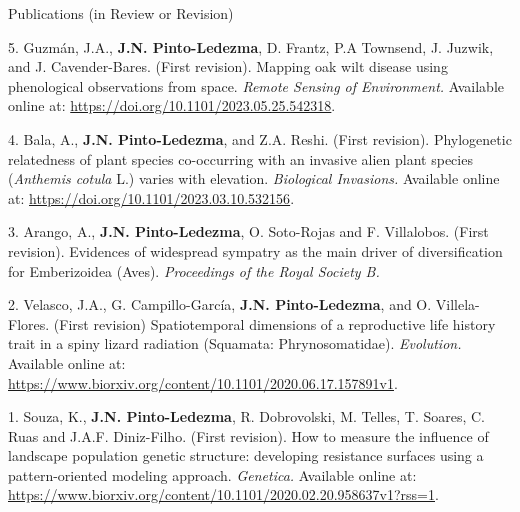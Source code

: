 \documentclass{resume} %
\begin{document}

\begin{rSection}{Publications (in Review or Revision)} 

\normalfont 

{5.} {Guzmán, J.A.,} {\bf{J.N. Pinto-Ledezma}}, {D. Frantz, P.A Townsend, J. Juzwik, and J. Cavender-Bares. (First revision). Mapping oak wilt disease using phenological observations from space.} {\em Remote Sensing of Environment.} {Available online at:} \url {https://doi.org/10.1101/2023.05.25.542318}.

{4.} {Bala, A.,} {\bf{J.N. Pinto-Ledezma\dag}}, and {Z.A. Reshi\dag. (First revision). Phylogenetic relatedness of plant species co-occurring with an invasive alien plant species ({\em Anthemis cotula} L.) varies with elevation.} {\em Biological Invasions.} {Available online at:} \url {https://doi.org/10.1101/2023.03.10.532156}.

{3.} {Arango, A.,} {\bf{J.N. Pinto-Ledezma}}, { O. Soto-Rojas and F. Villalobos. (First revision). Evidences of widespread sympatry as the main driver of diversification for Emberizoidea (Aves).} {\em Proceedings of the Royal Society B.}

{2.} {Velasco, J.A., G. Campillo-García,} {\bf{J.N. Pinto-Ledezma}}, {and O. Villela-Flores. (First revision) Spatiotemporal dimensions of a reproductive life history trait in a spiny lizard radiation (Squamata: Phrynosomatidae).} {\em Evolution.} {Available online at:} \url {https://www.biorxiv.org/content/10.1101/2020.06.17.157891v1}.

{1.} {Souza, K.,} {\bf{J.N. Pinto-Ledezma}}, {R. Dobrovolski, M. Telles, T. Soares, C. Ruas and J.A.F. Diniz-Filho. (First revision). How to measure the influence of landscape population genetic structure: developing resistance surfaces using a pattern-oriented modeling approach.} {\em Genetica.} {Available online at:} \url {https://www.biorxiv.org/content/10.1101/2020.02.20.958637v1?rss=1}.

\end{rSection}


\end{document}
